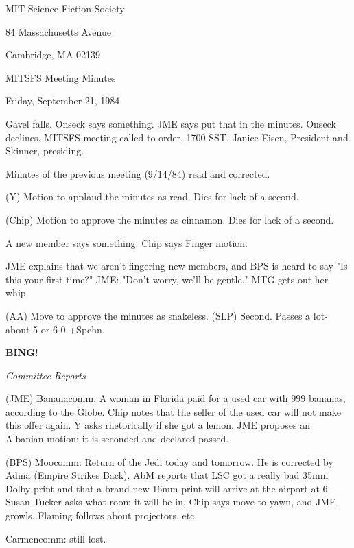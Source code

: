 \documentclass[12pt]{article}
\newcommand{\bing}{{\bf BING!} }
\newcommand{\goto}[1]{\bing \vskip 12pt \centerline{{\em{#1}}}}
\begin{document}
\begin{center}

MIT Science Fiction Society 

84 Massachusetts Avenue

Cambridge, MA 02139

\vspace{12pt}

MITSFS Meeting Minutes 

Friday, September 21, 1984

\end{center}
 
\vspace{18pt}

\setlength{\parskip}{6pt}

\noindent
Gavel falls. Onseck says something. JME says put that in the minutes.  Onseck declines. MITSFS meeting called to order, 1700 SST,
Janice Eisen, President and Skinner, presiding.

Minutes of the previous meeting (9/14/84) read and corrected.

(Y) Motion to applaud the minutes as read. Dies for lack of a second.

(Chip) Motion to approve the minutes as cinnamon. Dies for lack of a second.

A new member says something. Chip says Finger motion.

JME explains that we aren't fingering new members, and BPS is heard to say "Is this your first time?" JME: "Don't worry, we'll be gentle." MTG gets out her whip.

(AA) Move to approve the minutes as snakeless. (SLP) Second. Passes a lot-about 5 or 6-0 +Spehn.

\goto{Committee Reports}

(JME) Bananacomm: A woman in Florida paid for a used car with 999 bananas, according to the Globe. Chip notes that the seller of the used car will not make this offer again. Y asks rhetorically if she got a lemon. JME proposes an Albanian motion; it is seconded and declared passed.

(BPS) Moocomm: Return of the Jedi today and tomorrow. He is corrected by Adina (Empire Strikes Back). AbM reports that LSC got a really bad 35mm Dolby print and that a brand new 16mm print will arrive at the airport at 6. Susan Tucker asks what room it will be in, Chip says move to yawn, and JME growls. Flaming follows about projectors, etc.

Carmencomm: still lost.
\end{document}
